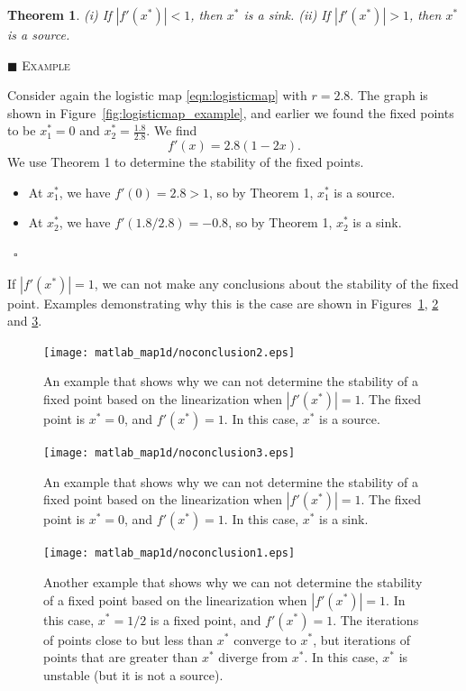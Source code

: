 \documentclass[reqno]{immbook}
\numberwithin{equation}{chapter}
\newtheorem{theorem}{Theorem}
\numberwithin{question}{section}
\numberwithin{theorem}{chapter}
\numberwithin{figure}{chapter}
\theoremstyle{definition}
\newenvironment{xexample}%
{%

\medskip\noindent\addtocounter{example}{1}$\blacksquare$ \textsc{Example \theexample}\hspace*{1em}%
}%
{%
~\hfill$\square$

\medskip
}
\begin{document}
\begin{theorem}
(i) If $|f'(x^*)| < 1$, then $x^*$ is a sink.
(ii) If $|f'(x^*)| > 1$, then $x^*$ is a source.
\end{theorem}

\begin{xexample}
Consider again the logistic map \eqref{eqn:logisticmap}
with $r=2.8$.  The graph is shown in
Figure~\ref{fig:logisticmap_example}, and earlier we found the
fixed points to be $x^*_1=0$ and $x^*_2=\frac{1.8}{2.8}$.
We find
\begin{equation}
  f'(x) = 2.8(1-2x).
\end{equation}
We use Theorem 1 to determine the stability of the fixed points.
\begin{itemize}
\item
At $x^*_1$, we have $f'(0) = 2.8 > 1$, so by Theorem 1,
$x^*_1$ is a source.
\item
At $x^*_2$, we have $f'(1.8/2.8) = -0.8$,
so by Theorem 1,
$x^*_2$ is a sink.
\end{itemize}
\end{xexample}

\bigskip
If $|f'(x^*)|=1$, we can not make any conclusions about the
stability of the fixed point.  Examples demonstrating why this
is the case are shown in Figures~\ref{fig:noconclusion2},
\ref{fig:noconclusion3}
and \ref{fig:noconclusion1}.
%
\begin{figure}
\centerline{%
\texttt{[image: matlab\_map1d/noconclusion2.eps]}%
}
\caption{An example that shows why we can not determine
the stability of a fixed point based on the linearization
when
$|f'(x^*)|=1$.  The fixed point is $x^*=0$, and $f'(x^*)=1$.
In this case, $x^*$ is a source.}
\label{fig:noconclusion2}
\end{figure}
%
\begin{figure}
\centerline{%
\texttt{[image: matlab\_map1d/noconclusion3.eps]}%
}
\caption{An example that shows why we can not determine
the stability of a fixed point based on the linearization
when
$|f'(x^*)|=1$.  The fixed point is $x^*=0$, and $f'(x^*)=1$.
In this case, $x^*$ is a sink.}
\label{fig:noconclusion3}
\end{figure}
%
\begin{figure}
\centerline{%
\texttt{[image: matlab\_map1d/noconclusion1.eps]}%
}
\caption{Another example that shows why we can not determine
the stability of a fixed point based on the linearization
when
$|f'(x^*)|=1$.  In this case, $x^*=1/2$ is a fixed point,
and $f'(x^*)=1$.
The iterations of points close to but less than $x^*$
converge to $x^*$, but iterations of points that are
greater than $x^*$ diverge from $x^*$.
In this case, $x^*$ is unstable (but it is not a source).
}
\label{fig:noconclusion1}
\end{figure}
\end{document}
